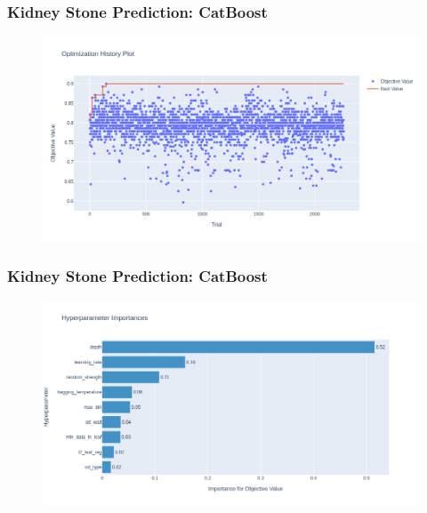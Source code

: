 \documentclass{beamer}
\begin{document}

\begin{frame}
\frametitle{Kidney Stone Prediction: CatBoost}
\begin{figure}[H]
 \centering
 \includegraphics[scale=0.3]{optuna_catboost_kidney.png}
\end{figure}
\end{frame}

\begin{frame}
\frametitle{Kidney Stone Prediction: CatBoost}
\begin{figure}[H]
 \centering
 \includegraphics[scale=0.3]{optuna_catboost_importance_kidney.png}
\end{figure}
\end{frame}
\end{document}
